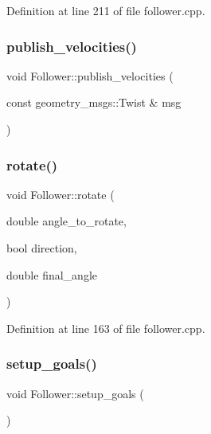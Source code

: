 Definition at line 211 of file follower.\+cpp.

\mbox{\label{class_follower_aaae1600959a929c269d557d9c09ba777}} 
\subsubsection{\texorpdfstring{publish\+\_\+velocities()}{publish\_velocities()}}
{\footnotesize\ttfamily void Follower\+::publish\+\_\+velocities (\begin{DoxyParamCaption}\item[{const geometry\+\_\+msgs\+::\+Twist \&}]{msg }\end{DoxyParamCaption})}

\mbox{\label{class_follower_abf8ec0da50295140bf750d30906a726b}} 
\subsubsection{\texorpdfstring{rotate()}{rotate()}}
{\footnotesize\ttfamily void Follower\+::rotate (\begin{DoxyParamCaption}\item[{double}]{angle\+\_\+to\+\_\+rotate,  }\item[{bool}]{direction,  }\item[{double}]{final\+\_\+angle }\end{DoxyParamCaption})}



Definition at line 163 of file follower.\+cpp.

\mbox{\label{class_follower_a9ff755f0d81808c372bfcaac0a45471c}} 
\subsubsection{\texorpdfstring{setup\+\_\+goals()}{setup\_goals()}}
{\footnotesize\ttfamily void Follower\+::setup\+\_\+goals (\begin{DoxyParamCaption}{ }\end{DoxyParamCaption})}




